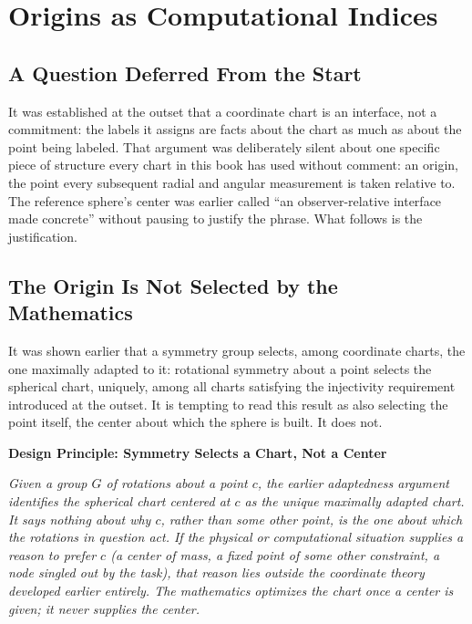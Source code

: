 \documentclass[11pt,fleqn]{book}
\numberwithin{equation}{chapter}
\newenvironment{principle}[1]
  {\begin{principleEnv}
   \noindent\textbf{Design Principle: #1}\par\smallskip\itshape}
  {\end{principleEnv}}
\theoremstyle{plain}
\theoremstyle{definition}
\theoremstyle{remark}
\providecommand{\enquote}[1]{``#1''}
\begin{document}

\chapter{Origins as Computational Indices}

\section{A Question Deferred From the Start}

It was established at the outset that a coordinate chart is an interface, not a commitment: the labels it assigns are facts about the chart as much as about the point being labeled. That argument was deliberately silent about one specific piece of structure every chart in this book has used without comment: an origin, the point every subsequent radial and angular measurement is taken relative to. The reference sphere's center was earlier called \enquote{an observer-relative interface made concrete} without pausing to justify the phrase. What follows is the justification.

\section{The Origin Is Not Selected by the Mathematics}

It was shown earlier that a symmetry group selects, among coordinate charts, the one maximally adapted to it: rotational symmetry about a point selects the spherical chart, uniquely, among all charts satisfying the injectivity requirement introduced at the outset. It is tempting to read this result as also selecting the point itself, the center about which the sphere is built. It does not.

\begin{principle}{Symmetry Selects a Chart, Not a Center}
Given a group \(G\) of rotations about a point \(c\), the earlier adaptedness argument identifies the spherical chart centered at \(c\) as the unique maximally adapted chart. It says nothing about why \(c\), rather than some other point, is the one about which the rotations in question act. If the physical or computational situation supplies a reason to prefer \(c\) (a center of mass, a fixed point of some other constraint, a node singled out by the task), that reason lies outside the coordinate theory developed earlier entirely. The mathematics optimizes the chart once a center is given; it never supplies the center.
\end{principle}
\end{document}
